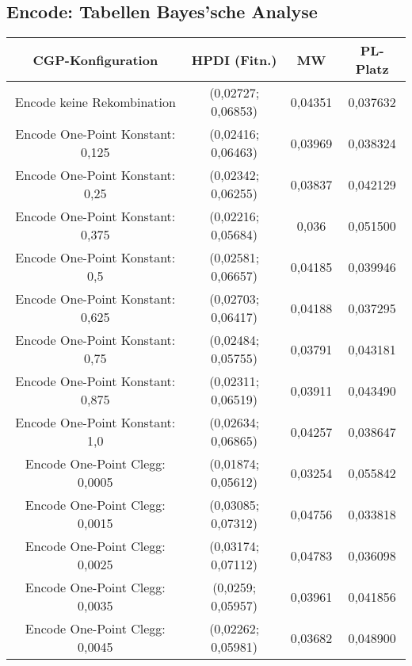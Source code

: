 \subsection{Encode: Tabellen Bayes'sche Analyse}
\label{subsec:appendixTabellesnBayesEncode}
\begin{table}[H]
	\centering
	\begin{tabular}{c | c | c | c}
		\textbf{CGP-Konfiguration} & \textbf{HPDI (Fitn.)} & \textbf{MW} & \textbf{PL-Platz}\\
		\hline
		Encode keine Rekombination & (0,02727; 0,06853) & \color{red}0,04351\color{black} & 0,037632\\
		\hline
		\hline
		Encode One-Point Konstant: 0,125 & (0,02416; 0,06463) & 0,03969 & 0,038324\\
		\hline
		Encode One-Point Konstant: 0,25 & (0,02342; 0,06255) & 0,03837 & 0,042129\\
		\hline
		Encode One-Point Konstant: 0,375 & (0,02216; 0,05684) & \color{Green}0,036\color{black} & \color{Green}0,051500\color{black}\\
		\hline
		Encode One-Point Konstant: 0,5 & (0,02581; 0,06657) & 0,04185 & 0,039946\\
		\hline
		Encode One-Point Konstant: 0,625 & (0,02703; 0,06417) & 0,04188 & 0,037295\\
		\hline
		Encode One-Point Konstant: 0,75 & \color{Green}(0,02484; 0,05755)\color{black} & 0,03791 & 0,043181\\
		\hline
		Encode One-Point Konstant: 0,875 & (0,02311; 0,06519) & 0,03911 & 0,043490\\
		\hline
		Encode One-Point Konstant: 1,0 & \color{red}(0,02634; 0,06865)\color{black} & 0,04257 & 0,038647\\
		\hline
		\hline
		Encode One-Point Clegg: 0,0005 & (0,01874; 0,05612) & \color{Green}0,03254\color{black} & \color{Green}0,055842\color{black}\\
		\hline
		Encode One-Point Clegg: 0,0015 & \color{red}(0,03085; 0,07312)\color{black} & \color{red}0,04756\color{black} & \color{red}0,033818\color{black}\\
		\hline
		Encode One-Point Clegg: 0,0025 & (0,03174; 0,07112) & \color{red}0,04783\color{black} & \color{red}0,036098\color{black}\\
		\hline
		Encode One-Point Clegg: 0,0035 & (0,0259; 0,05957) & 0,03961 & 0,041856\\
		\hline
		Encode One-Point Clegg: 0,0045 & (0,02262; 0,05981) & 0,03682 & 0,048900\\

\end{tabular}
\end{table}
